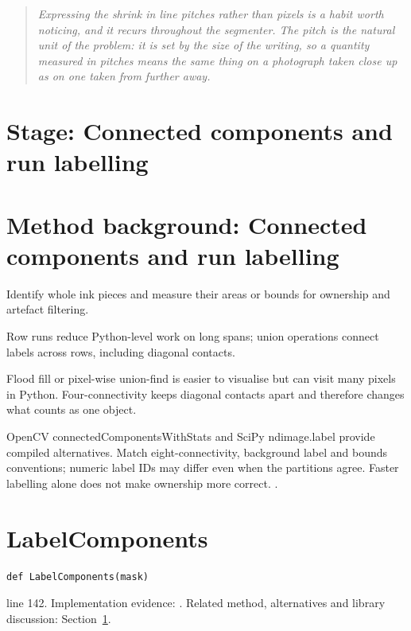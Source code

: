 \begin{quote}\small\itshape Expressing the shrink in line pitches rather than pixels is a habit worth noticing, and it recurs throughout the segmenter. The pitch is the natural unit of the problem: it is set by the size of the writing, so a quantity measured in pitches means the same thing on a photograph taken close up as on one taken from further away.\end{quote}


\section*{Stage: Connected components and run labelling}
\section{Method background: Connected components and run labelling}\label{method:components}
Identify whole ink pieces and measure their areas or bounds for ownership and artefact filtering.


Row runs reduce Python-level work on long spans; union operations connect labels across rows, including diagonal contacts.


Flood fill or pixel-wise union-find is easier to visualise but can visit many pixels in Python. Four-connectivity keeps diagonal contacts apart and therefore changes what counts as one object.


OpenCV connectedComponentsWithStats and SciPy ndimage.label provide compiled alternatives. Match eight-connectivity, background label and bounds conventions; numeric label IDs may differ even when the partitions agree. Faster labelling alone does not make ownership more correct. \cite{he2008,tarjan1975,opencvshape,scipylabel}.


\section{LabelComponents}\label{fn:segment:LabelComponents}
\begin{lstlisting}[style=sig]
def LabelComponents(mask)
\end{lstlisting}
 line 142. Implementation evidence: \cite{code2026}. Related method, alternatives and library discussion: Section~\ref{method:components}.



